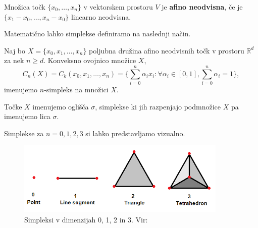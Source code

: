 \begin{definicija}
  Množica točk $\{x_0, \dots, x_n\}$ v vektorskem prostoru $V$ je \textbf{afino neodvisna}, če je $\{x_1 - x_0, \dots, x_n - x_0\}$ linearno neodvisna.
\end{definicija}

Matematično lahko simplekse definiramo na naslednji način.

\begin{definicija}
  Naj bo \(X = \{x_0, x_1, \dots, x_n\}\) poljubna družina afino neodvisnih točk v prostoru \(\mathbb{R}^d\) za nek \(n \geq d\). Konveksno ovojnico množice \(X\),
  \[
    C_n(X) = C_k(x_0, x_1, \dots, x_n) = \{\sum_{i=0}^n \alpha_i x_i : \forall \alpha_i \in [0, 1], \sum_{i=0}^n \alpha_i = 1\},
  \]
  imenujemo \(n\)-simpleks na množici \(X\).
\end{definicija}

Točke \(X\) imenujemo oglišča \(\sigma\), simplekse ki jih razpenjajo podmnožice \(X\) pa imenujemo lica \(\sigma\).

Simplekse za $n = 0, 1, 2, 3$ si lahko predstavljamo vizualno.

\begin{figure}[H]
  \centering
  \includegraphics{resources/simplex.png}
  \caption{Simpleksi v dimenzijah 0, 1, 2 in 3. Vir:~\cite{schneider_simplexes}}\label{fig:enter-label1}
\end{figure}

